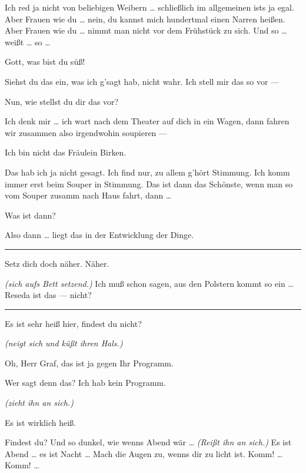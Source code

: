 \documentclass[
	final,
	a4paper,
	ngerman,
	mpinclude = true, %
	twoside = true,
	open = right,
	cleardoublepage = plain,
	DIV = 13,
	BCOR = 1cm,
	titlepage = firstiscover,
	]{scrbook}
\newcommand{\direction}[1]{\textit{(#1)}}
\newenvironment{deletion}{%
		\vspace{0.25\baselineskip}
		\hrule
		\vspace{0.25\baselineskip}
		\color{darkgray}
	}{
		\color{black}
		\vspace{0.25\baselineskip}
		\hrule 
		\vspace{0.25\baselineskip}
	}
\newcommand{\thecharacter}[1]{\textup{\textsc{#1}}\xspace}
\newcommand{\theschauspielerin}{\thecharacter{Schauspielerin}}
\newcommand{\thegraf}{\thecharacter{Entrepeneurin}}
\newcommand{\character}[1]{\item[#1:]}
\newcommand{\schauspielerin}{\character{\theschauspielerin}}
\newcommand{\entrepeneurin}{\character{\thegraf}}
\begin{document}
\begin{play}
	\entrepeneurin
	Ich red ja nicht von beliebigen Weibern \ldots{} schließlich im allgemeinen ists ja egal. Aber Frauen wie du \ldots{} nein, du kannst mich hundertmal einen Narren heißen. Aber Frauen wie du \ldots{} nimmt man nicht vor dem Frühstück zu sich. Und so \ldots{} weißt \ldots{} so \ldots{}

	\schauspielerin
	Gott, was bist du süß!

	\entrepeneurin
	Siehst du das ein, was ich g'sagt hab, nicht wahr. Ich stell mir das so vor ---

	\schauspielerin
	Nun, wie stellst du dir das vor?

	\entrepeneurin
	Ich denk mir \ldots{} ich wart nach dem Theater auf dich in ein Wagen, dann fahren wir zusammen also irgendwohin soupieren ---

	\schauspielerin
	Ich bin nicht das Fräulein Birken.

	\entrepeneurin
	Das hab ich ja nicht gesagt. Ich find nur, zu allem g'hört Stimmung. Ich komm immer erst beim Souper in Stimmung. Das ist dann das Schönste, wenn man so vom Souper zusamm nach Haus fahrt, dann \ldots{}

	\schauspielerin
	Was ist dann?

	\entrepeneurin
	Also dann \ldots{} liegt das in der Entwicklung der Dinge.

	\begin{deletion}
	\schauspielerin
	Setz dich doch näher. Näher.

	\entrepeneurin
	\direction{sich aufs Bett setzend.} Ich muß schon sagen, aus den Polstern kommt so ein \ldots{} Reseda ist das --- nicht?

	\end{deletion}
	\schauspielerin
	Es ist sehr heiß hier, findest du nicht?

	\entrepeneurin
	\direction{neigt sich und küßt ihren Hals.}

	\schauspielerin
	Oh, Herr Graf, das ist ja gegen Ihr Programm.

	\entrepeneurin
	Wer sagt denn das? Ich hab kein Programm.

	\schauspielerin
	\direction{zieht ihn an sich.}

	\entrepeneurin
	Es ist wirklich heiß.

	\schauspielerin
	Findest du? Und so dunkel, wie wenns Abend wär \ldots{} \direction{Reißt ihn an sich.} Es ist Abend \ldots{} es ist Nacht \ldots{} Mach die Augen zu, wenns dir zu licht ist. Komm! \ldots{} Komm! \ldots{}


\end{play}
\end{document}
